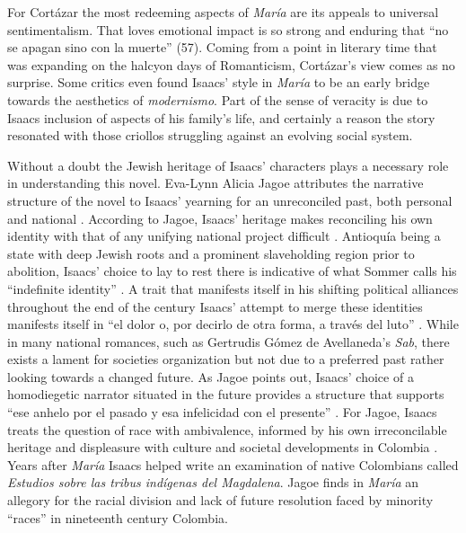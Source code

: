 \documentclass[12pt]{report}\usepackage[]{graphicx}\usepackage[]{color}
\begin{document}
\begin{spacing}{1.9}
For Cortázar the most redeeming aspects of \textit{María} are its appeals to universal sentimentalism. 
That loves emotional impact is so strong and enduring that \enquote{no se apagan sino con la muerte} (57). 
Coming from a point in literary time that was expanding on the halcyon days of Romanticism, Cortázar's view comes as no surprise. 
Some critics even found Isaacs' style in \textit{María} to be an early bridge towards the aesthetics of \textit{modernismo}.
Part of the sense of veracity is due to Isaacs inclusion of aspects of his family's life, and certainly a reason the story resonated with those criollos struggling against an evolving social system. 


Without a doubt the Jewish heritage of Isaacs' characters plays a necessary role in understanding this novel. 
Eva-Lynn Alicia Jagoe attributes the narrative structure of the novel to Isaacs' yearning for an unreconciled past, both personal and national \autocite[145]{Jagoe2003}.
According to Jagoe, Isaacs' heritage makes reconciling his own identity with that of any unifying national project difficult \autocite[145]{Jagoe2003}.
Antioquía being a state with deep Jewish roots and a prominent slaveholding region prior to abolition, Isaacs' choice to lay to rest there is indicative of what Sommer calls his \enquote{indefinite identity} \autocite[269]{Sommer1997}.
A trait that manifests itself in his shifting political alliances throughout the end of the century \autocite[270]{Sommer1997}
Isaacs' attempt to merge these identities manifests itself in \enquote{el dolor o, por decirlo de otra forma, a través del luto} \autocite[145]{Jagoe2003}.
While in many national romances, such as Gertrudis Gómez de Avellaneda's \textit{Sab}, there exists a lament for societies organization but not due to a preferred past rather looking towards a changed future.
As Jagoe points out, Isaacs' choice of a homodiegetic narrator situated in the future provides a structure that supports \enquote{ese anhelo por el pasado y esa infelicidad con el presente} \autocite[147]{Jagoe2003}.
For Jagoe, Isaacs treats the question of race with ambivalence, informed by his own irreconcilable heritage and displeasure with culture and societal developments in Colombia \autocite[158]{Jagoe2003}.
Years after \textit{María} Isaacs helped write an examination of native Colombians called \textit{Estudios sobre las tribus indígenas del Magdalena}.
Jagoe finds in \textit{María} an allegory for the racial division and lack of future resolution faced by minority \enquote{races} in nineteenth century Colombia.



\end{spacing}
\end{document}
